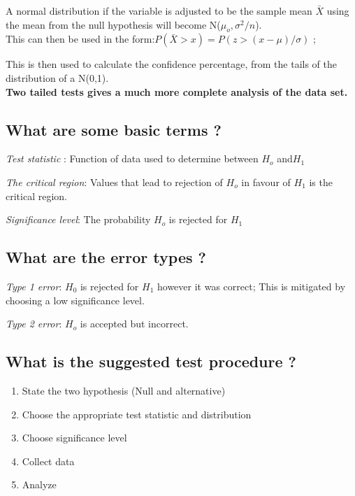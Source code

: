 \documentclass[11pt]{scrartcl} %
\begin{document}
A normal distribution if the variable is adjusted to be the sample mean
\(\bar{X}\) using the mean from the null hypothesis will become
N(\(\mu_o,\sigma^2/n\)).\\

This can then be used in the form:\(P(\bar{X} > x) = P(z > (x-\mu) /\sigma)\) ; 

This is then used to calculate the confidence percentage, from the tails of the distribution
of a N(0,1).\\

\textbf{Two tailed tests gives a much more complete analysis of the data
set.}

\subsection{What are some basic terms
?}

\emph{Test statistic} : Function of data used to determine between
\(H_o\) and\(H_1\)

\emph{The critical region}: Values that lead to rejection of \(H_o\) in
favour of \(H_1\) is the critical region.

\emph{Significance level}: The probability \(H_o\) is rejected for
\(H_1\)

\subsection{What are the error types
?}

\emph{Type 1 error}: \(H_0\) is rejected for \(H_1\) however it was
correct; This is mitigated by choosing a low significance level.

\emph{Type 2 error}: \(H_o\) is accepted but incorrect.

\subsection{What is the suggested test procedure
?}

\begin{enumerate}
\item State the two hypothesis (Null and alternative)
\item Choose the appropriate test statistic and distribution
\item Choose significance level
\item Collect data
\item Analyze
\end{enumerate}
\end{document}
